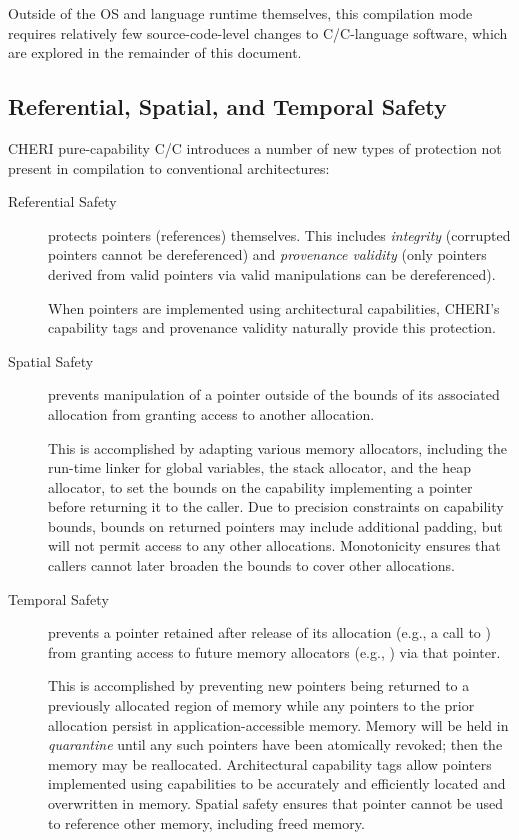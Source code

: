 \documentclass[12pt,twoside,openright,a4paper]{article}
\newcommand{\ccode}[1]{{\small\ttfamily{#1}}}
\newcommand{\cfunc}[1]{{\ccode{#1()}}}
\newcommand{\note}[2]{{\color{blue}[ Note: #1 - #2]}}
\renewcommand{\note}[2]{\relax\ifhmode\unskip\fi}
\newcommand{\psnote}[1]{\note{#1}{Peter S.}}
\newcommand*{\cpp}[1][]{C\textsmaller[2]{\nolinebreak[4]\hspace{-.05em}\raisebox{.45ex}{\textbf{++}}}}
\newcommand*{\purecapCOrCpp}[1]{CHERI pure-capability C/\cpp{}}
\begin{document}
Outside of the OS and language runtime themselves, this compilation mode
requires relatively few source-code-level changes to C/\cpp{}-language software,
which are explored in the remainder of this document.

\subsection{Referential, Spatial, and Temporal Safety}

\purecapCOrCpp{} introduces a number of new types of protection not
present in compilation to conventional architectures:

\begin{description}
\item[Referential Safety] protects pointers (references) themselves.
  This includes \textit{integrity} (corrupted pointers cannot be dereferenced)
  and \textit{provenance validity} (only pointers derived from valid pointers
  via valid manipulations can be dereferenced).

  When pointers are implemented using architectural capabilities, CHERI's
  capability tags and provenance validity naturally provide this protection.

\item[Spatial Safety] prevents manipulation of a pointer outside of the bounds
  of its associated allocation from granting access to another allocation.

  \psnote{minor wording change for clarity}
  This is accomplished by adapting various memory allocators, including the run-time
  linker for global variables, the stack allocator, and the heap allocator,
  to set the bounds on the capability implementing a pointer before returning
  it to the caller.
  Due to precision constraints on capability bounds, bounds on returned
  pointers may include additional padding, but will not permit access to any
  other allocations.
  Monotonicity ensures that callers cannot later broaden the bounds to cover
  other allocations.

\psnote{this reads as if temporal safety is always on, for heap and stack and everything, and the post-caveat isn't really enough to counteract that.  I'd suggest putting the first part of the post-caveat text here}
  
\item[Temporal Safety] prevents a pointer retained after release of its allocation
  (e.g., a call to \cfunc{free}) from granting access to future memory allocators
  (e.g., \cfunc{malloc}) via that pointer.

  This is accomplished by preventing new pointers being returned to a
  previously allocated region of memory while any pointers to the prior
  allocation persist in application-accessible memory.
  Memory will be held in \textit{quarantine} until any such pointers have been
  atomically revoked; then the memory may be reallocated.
  Architectural capability tags allow pointers implemented using capabilities
  to be accurately and efficiently located and overwritten in memory.
  Spatial safety ensures that pointer cannot be used to reference other
  memory, including freed memory.
\end{description}
\end{document}
